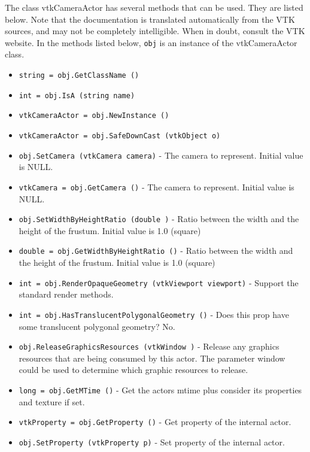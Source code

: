 The class vtkCameraActor has several methods that can be used.
  They are listed below.
Note that the documentation is translated automatically from the VTK sources,
and may not be completely intelligible.  When in doubt, consult the VTK website.
In the methods listed below, \verb|obj| is an instance of the vtkCameraActor class.
\begin{itemize}
\item  \verb|string = obj.GetClassName ()|

\item  \verb|int = obj.IsA (string name)|

\item  \verb|vtkCameraActor = obj.NewInstance ()|

\item  \verb|vtkCameraActor = obj.SafeDownCast (vtkObject o)|

\item  \verb|obj.SetCamera (vtkCamera camera)| -  The camera to represent. Initial value is NULL.

\item  \verb|vtkCamera = obj.GetCamera ()| -  The camera to represent. Initial value is NULL.

\item  \verb|obj.SetWidthByHeightRatio (double )| -  Ratio between the width and the height of the frustum. Initial value is
 1.0 (square)

\item  \verb|double = obj.GetWidthByHeightRatio ()| -  Ratio between the width and the height of the frustum. Initial value is
 1.0 (square)

\item  \verb|int = obj.RenderOpaqueGeometry (vtkViewport viewport)| -  Support the standard render methods.

\item  \verb|int = obj.HasTranslucentPolygonalGeometry ()| -  Does this prop have some translucent polygonal geometry? No.

\item  \verb|obj.ReleaseGraphicsResources (vtkWindow )| -  Release any graphics resources that are being consumed by this actor.
 The parameter window could be used to determine which graphic
 resources to release.

\item  \verb|long = obj.GetMTime ()| -  Get the actors mtime plus consider its properties and texture if set.

\item  \verb|vtkProperty = obj.GetProperty ()| -  Get property of the internal actor.

\item  \verb|obj.SetProperty (vtkProperty p)| -  Set property of the internal actor.

\end{itemize}
